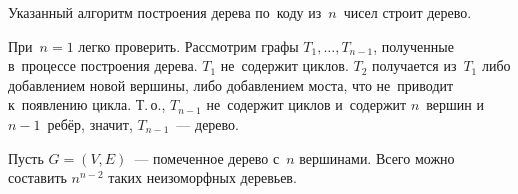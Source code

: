 \begin{statement}
\label{st:matching_of_trees_to_codes}
Указанный алгоритм построения дерева по~коду из~$n$~чисел строит дерево.
\end{statement}
\begin{proofmathind}
	\indbase При~$n = 1$ легко проверить.
	\indstep Рассмотрим графы $T_1, \ldots, T_{n-1}$, полученные в~процессе построения дерева.
	$T_1$ не~содержит циклов.
	$T_2$ получается из~$T_1$ либо добавлением новой вершины, либо добавлением моста, что не~приводит к~появлению цикла.	
	Т.\,о., $T_{n-1}$ не~содержит циклов и~содержит $n$~вершин и~$n - 1$~ребёр, значит, $T_{n-1}$~--- дерево.
	\indend
\end{proofmathind}

\begin{theorem}[Кэли]
Пусть $G = (V, E)$~--- помеченное дерево с~$n$ вершинами. Всего можно составить $n^{n-2}$ таких неизоморфных деревьев.
\end{theorem}